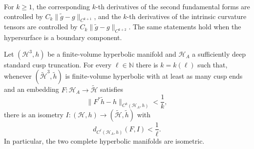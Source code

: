 \begin{remark}
\label{rem:chow-iv-hypersurface-geometry-higher-order-stability}


For \(k\ge1\), the corresponding \(k\)-th derivatives of the second
fundamental forms are controlled by \(C_k\|\widetilde g-g\|_{C^{k+1}}\), and
the \(k\)-th derivatives of the intrinsic curvature tensors are controlled by
\(C_k\|\widetilde g-g\|_{C^{k+2}}\).  The same statements hold when the
hypersurface is a boundary component.
\end{remark}

\begin{theorem}
\label{thm:chow-iv-isometry-near-almost-isometry}


Let \((\mathcal H^3,h)\) be a finite-volume hyperbolic manifold and
\(\mathcal H_A\) a sufficiently deep standard cusp truncation.  For every
\(\ell\in\mathbb N\) there is \(k=k(\ell)\) such that, whenever
\((\widetilde{\mathcal H}^3,\widetilde h)\) is finite-volume hyperbolic with at
least as many cusp ends and an embedding
\(F:\mathcal H_A\to\widetilde{\mathcal H}\) satisfies
\[
 \|F^*\widetilde h-h\|_{C^k(\mathcal H_A,h)}<\frac1k,
\]
there is an isometry \(I:(\mathcal H,h)\to
(\widetilde{\mathcal H},\widetilde h)\) with
\[
 d_{C^\ell(\mathcal H_A,h)}(F,I)<\frac1\ell.
\]
In particular, the two complete hyperbolic manifolds are isometric.
\end{theorem}
